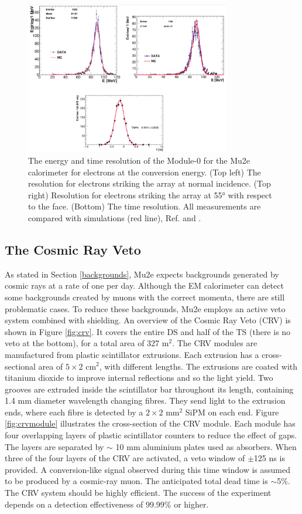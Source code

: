 \begin{figure}[!h]
    \centering
    \includegraphics[width =0.8\textwidth]{figures/png/Screenshot_20240330_105520.png}
    \caption{The energy and time resolution of the Module-0 for the Mu2e calorimeter for electrons at the conversion energy. (Top left) The resolution for electrons striking the
    array at normal incidence. (Top right) Resolution for electrons striking the array at 55° with respect to the face. (Bottom) The time resolution. 
    All measurements are compared with simulations (red line), Ref. \cite{bobbb} and \cite{calo95}.}
                \label{fig:calores}
                \end{figure}
\subsection{The Cosmic Ray Veto}\label{CRV}
As stated in Section \ref{backgrounds}, Mu2e expects backgrounds generated by cosmic rays 
at a rate of one per day. Although the EM calorimeter can detect some backgrounds created 
by muons with the correct momenta, there are still problematic cases. To reduce these 
backgrounds, Mu2e employs an active veto system combined with shielding. An overview 
of the Cosmic Ray Veto (CRV) is shown in Figure \ref{fig:crv}. It covers the entire 
DS and half of the TS (there is no veto at the bottom), for a total area of 327 m$^2$.
The CRV modules are manufactured from plastic scintillator extrusions. Each extrusion 
has a cross-sectional area of $5 \times 2$ cm$^2$, with different lengths. The extrusions 
are coated with titanium dioxide to improve internal reflections and so the light yield. 
Two grooves are extruded inside the scintillator bar throughout its length, containing 
1.4 mm diameter wavelength changing fibres. They send light to the extrusion ends, 
where each fibre is detected by a $2 \times 2$ mm$^2$ SiPM on each end. Figure \ref{fig:crvmodule} 
illustrates the cross-section of the CRV module. Each module has four overlapping layers of plastic 
scintillator counters to reduce the effect of gaps. The layers are separated by $\sim$ 10 mm aluminium 
plates used as absorbers. When three of the four layers of the CRV are activated, a veto window of $\pm$125 ns 
is provided. A conversion-like signal observed during this time window is assumed to be produced by a cosmic-ray muon. 
The anticipated total dead time is $\sim$5\%. The CRV system should be highly efficient. 
The success of the experiment depends on a detection effectiveness of 99.99\% or higher.


